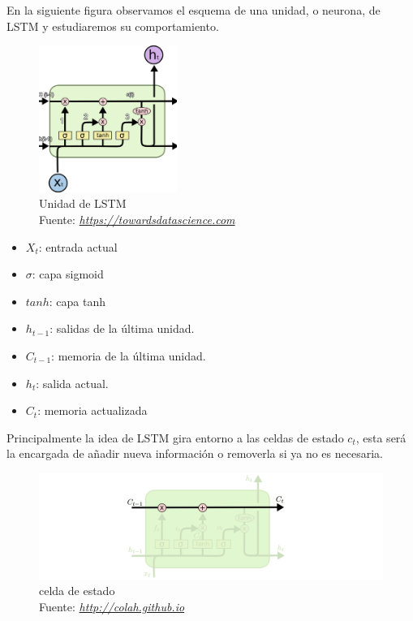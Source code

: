 En la siguiente figura observamos el esquema de una unidad, o neurona, de LSTM y estudiaremos su comportamiento.
\begin{figure}[H]
	\centering
	\includegraphics[width=0.4\textwidth]{Figures/LSTM.png}
	\caption{Unidad de LSTM \\ Fuente:  \href{https://towardsdatascience.com/understanding-lstm-and-its-quick-implementation-in-keras-for-sentiment-analysis-af410fd85b47g}{\textit{https://towardsdatascience.com}}}
	\label{}
\end{figure}

\begin{itemize}
	\item $X_{t}$: entrada actual
	\item $\sigma$: capa sigmoid
	\item $tanh$: capa tanh
	\item $h_{t-1}$: salidas de la última unidad.
	\item $C_{t-1}$: memoria de la última unidad.
	\item $h_{t}$: salida actual.
	\item $C_{t}$: memoria actualizada
	
\end{itemize}


Principalmente la idea de LSTM gira entorno a las celdas de estado  $c_{t}$, esta será la encargada de añadir nueva información o removerla si ya no es necesaria.

\begin{figure}[H]
	\centering
	\includegraphics[width=1\textwidth]{Figures/kernel.png}
	\caption{celda de estado \\ Fuente:  \href{http://colah.github.io/posts/2015-08-Understanding-LSTMs/}{\textit{http://colah.github.io}}}
	\label{}
\end{figure}

